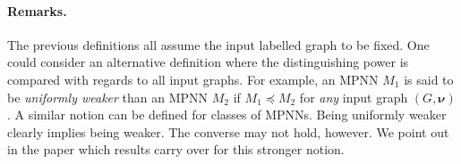 \paragraph{Remarks.} The previous definitions all assume the input labelled graph to be fixed. One could consider an alternative definition where the distinguishing power is compared with regards to all
input graphs. For example, an MPNN $M_1$ is said to be \textit{uniformly weaker} than an MPNN $M_2$ if $M_1\preceq M_2$ for \textit{any} input graph $( G,\pmb{\nu})$. A similar notion can be defined for classes of MPNNs. Being uniformly weaker clearly implies being weaker. The converse may not hold, however. We point out in the paper which results carry over for this stronger notion.

